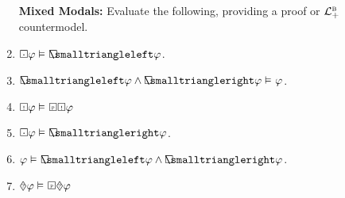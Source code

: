 \documentclass[a4paper, 11pt]{article}                  %
\begin{document}
\begin{enumerate}
{        In $\BL$, we could regiment the claim as $\diamondtimes \Future R \rightarrow \Box \Future R$. 

        In $\BLP$, we could regiment the claim as $\could \Will R \rightarrow \Will R$. 
      }

	\item[\bf Mixed Modals:] Evaluate the following, providing a proof or $\BLP$ countermodel.

    \item $\Inevitably\metaA \MLmodels[] \Openpast\metaA$.

    \item $\Openpast\metaA \wedge \Openfuture\metaA \MLmodels[] \metaA$.

    \item $\Will\metaA \MLmodels[] \Past\Will\metaA$

    \item $\Inevitably\metaA \MLmodels[] \Openfuture\metaA$.

    \item $\metaA \MLmodels[] \Openpast\metaA \wedge \Openfuture\metaA$.

    \item $\could\metaA \MLmodels[] \Past\could\metaA$


\end{enumerate}




\end{document}
